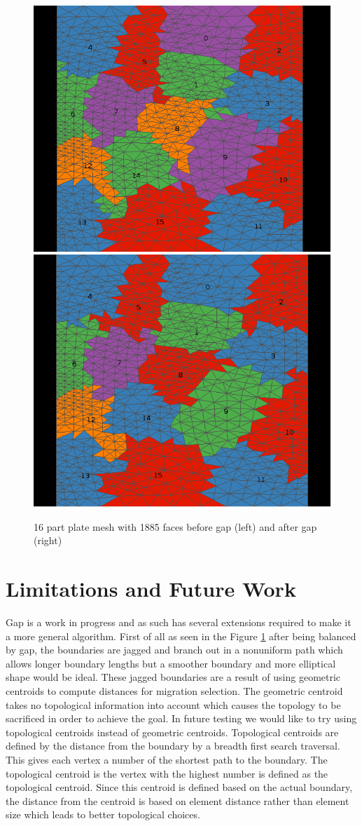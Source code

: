 \documentclass{thesis}
\begin{document}
\begin{figure} [!hp]
\centering
\captionsetup{justification=centering,margin=1cm}
\includegraphics[width=.4\textwidth]{before_1885.png}
\includegraphics[width=.4\textwidth]{after_1885.png}
\caption{\label{fig:gap3} \textnormal{16 part plate mesh with 1885 faces before gap (left) and after gap (right)}}
\end{figure}


\chapter{Limitations and Future Work} 

Gap is a work in progress and as such has several extensions required to make 
it a more general algorithm. First of all as seen in the Figure \ref{fig:gap3} 
after being balanced by gap, the boundaries are jagged and branch out in a 
nonuniform path which allows longer boundary lengths but a smoother boundary 
and more elliptical shape would be ideal.  These jagged boundaries are a 
result of using geometric centroids to compute distances for migration 
selection. The geometric centroid takes no topological information into account 
which causes the topology to be sacrificed in order to achieve the goal. In 
future testing we would like to try using topological centroids instead of 
geometric centroids. Topological centroids are defined by the distance from the 
boundary by a breadth first search traversal. This gives each vertex a number 
of the shortest path to the boundary. The topological centroid is the vertex 
with the highest number is defined as the topological centroid. Since this 
centroid is defined based on the actual boundary, the distance from the 
centroid is based on element distance rather than element size which leads to 
better topological choices.
\end{document}
